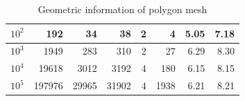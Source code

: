 \documentclass[pdflatex,sn-mathphys]{sn-jnl}%
\theoremstyle{thmstyleone}%
\theoremstyle{thmstyletwo}%
\theoremstyle{thmstylethree}%
\begin{document}
\begin{table}
{\begin{tabular}{|r|r|r|r|r|r|r|r|}
$10^2$                                                                       & 192                                                                            & 34                                                                                   & 38                                                                                   & 2                                                                                              & 4                              & 5.05                                                                                  & 7.18                                                                              \\ \hline
$10^3$                                                                       & 1949                                                                           & 283                                                                                  & 310                                                                                  & 2                                                                                              & 27                             & 6.29                                                                                  & 8.30                                                                              \\ \hline
$10^4$                                                                       & 19618                                                                          & 3012                                                                                 & 3192                                                                                 & 4                                                                                              & 180                            & 6.15                                                                                  & 8.15                                                                              \\ \hline
$10^5$                                                                       & 197976                                                                         & 29965                                                                                & 31902                                                                                & 4                                                                                              & 1938                           & 6.21                                                                                  & 8.21                                                                              \\ \hline
\end{tabular}
}
\caption{Geometric information of polygon mesh }%
\label{table:results}
\end{table}
\end{document}
